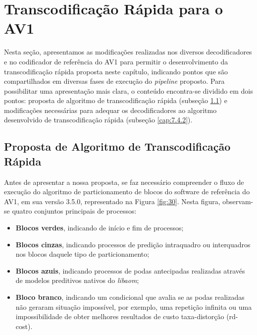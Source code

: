 \section{Transcodificação Rápida para o AV1}
\label{cap:7.4}

Nesta seção, apresentamos as modificações realizadas nos diversos decodificadores e no codificador de referência do AV1 para permitir o desenvolvimento da transcodificação rápida proposta neste capítulo, indicando pontos que são compartilhados em diversas fases de execução do \textit{pipeline} proposto. Para possibilitar uma apresentação mais clara, o conteúdo encontra-se dividido em dois pontos: proposta de algoritmo de transcodificação rápida (subseção \ref{cap:7.4.1}) e modificações necessárias para adequar os decodificadores ao algoritmo desenvolvido de transcodificação rápida (subseção \ref{cap:7.4.2}).

\subsection{Proposta de Algoritmo de Transcodificação Rápida}
\label{cap:7.4.1}

Antes de apresentar a nossa proposta, se faz necessário compreender o fluxo de execução do algoritmo de particionamento de blocos do software de referência do AV1, em sua versão 3.5.0, representado na Figura \ref{fig:30}. Nesta figura, observam-se quatro conjuntos principais de processos: 

\begin{itemize}
    \item \textbf{Blocos verdes}, indicando de início e fim de processos;

    \item \textbf{Blocos cinzas}, indicando processos de predição intraquadro ou interquadros nos blocos daquele tipo de particionamento;

    \item \textbf{Blocos azuis}, indicando processos de podas antecipadas realizadas através de modelos preditivos nativos do \textit{libaom};

    \item \textbf{Bloco branco}, indicando um condicional que avalia se as podas realizadas não geraram situação impossível, por exemplo, uma repetição infinita ou uma impossibilidade de obter melhores resultados de custo taxa-distorção (rd-cost).
\end{itemize}

